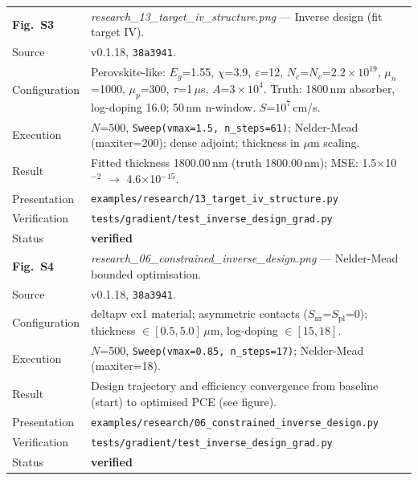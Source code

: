 \documentclass[11pt,a4paper]{article}
\begin{document}
\begin{table}[tbp]
\begin{tabularx}{\linewidth}{@{}Z Y@{}}
\textbf{Fig.~S3} &
\textit{research\_13\_target\_iv\_structure.png} ---
Inverse design (fit target IV). \\
Source & v0.1.18, \texttt{38a3941}. \\
Configuration &
  Perovskite-like: $E_g$=1.55, $\chi$=3.9, $\varepsilon$=12,
  $N_c$=$N_v$=$2.2{\times}10^{19}$, $\mu_n$=1000, $\mu_p$=300,
  $\tau$=1\,$\mu$s, $A$=$3{\times}10^4$.  Truth: 1800\,nm absorber,
  log-doping 16.0; 50\,nm n-window.  $S$=$10^7$\,cm/s. \\
Execution &
  $N$=500, \texttt{Sweep(vmax=1.5, n\_steps=61)};
  Nelder-Mead (maxiter=200); dense adjoint; thickness in $\mu$m scaling. \\
Result &
  Fitted thickness 1800.00\,nm (truth 1800.00\,nm);
  MSE: 1.5$\times$10$^{-2}$ $\to$ 4.6$\times$10$^{-15}$. \\
Presentation &
  \texttt{examples/research/13\_target\_iv\_structure.py} \\
Verification &
  \texttt{tests/gradient/test\_inverse\_design\_grad.py} \\
Status & \textcolor{green!50!black}{\textbf{verified}} \\[4pt]

\textbf{Fig.~S4} &
\textit{research\_06\_constrained\_inverse\_design.png} ---
Nelder-Mead bounded optimisation. \\
Source & v0.1.18, \texttt{38a3941}. \\
Configuration &
  deltapv ex1 material; asymmetric contacts ($S_\mathrm{nr}$=$S_\mathrm{pl}$=0);
  thickness $\in[0.5,5.0]$\,$\mu$m, log-doping $\in[15,18]$. \\
Execution &
  $N$=500, \texttt{Sweep(vmax=0.85, n\_steps=17)};
  Nelder-Mead (maxiter=18). \\
Result &
  Design trajectory and efficiency convergence from baseline
  (start) to optimised PCE (see figure). \\
Presentation &
  \texttt{examples/research/06\_constrained\_inverse\_design.py} \\
Verification &
  \texttt{tests/gradient/test\_inverse\_design\_grad.py} \\
Status & \textcolor{green!50!black}{\textbf{verified}} \\[4pt]


\end{tabularx}
\end{table}
\end{document}
